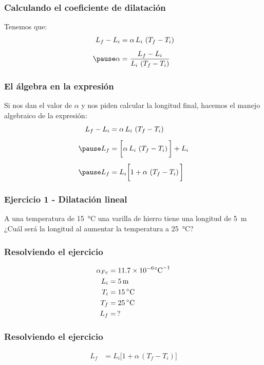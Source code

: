\documentclass[14pt]{beamer}
\begin{document}
\begin{frame}
\frametitle{Calculando el coeficiente de dilatación}
Tenemos que:
\pause
\begin{eqnarray*}
\begin{aligned}
L_{f} - L_{i} &= \alpha \, L_{i} \, \left( T_{f} - T_{i} \right) \\[0.5em] \pause
\alpha &= \dfrac{L_{f} - L_{i}}{L_{i} \, \left( T_{f} - T_{i} \right)}
\end{aligned}
\end{eqnarray*}
\end{frame}
\begin{frame}
\frametitle{El álgebra en la expresión}
Si nos dan el valor de $\alpha$ y nos piden calcular la longitud final, hacemos el manejo algebraico de la expresión:
\pause
\begin{eqnarray*}
\begin{aligned}
L_{f} - L_{i} &= \alpha \, L_{i} \, \left( T_{f} - T_{i} \right) \\[0.5em] \pause
L_{f} &= \bigg[ \alpha \, L_{i} \, \left( T_{f} - T_{i} \right) \bigg] + L_{i} \\[0.5em] \pause
L_{f} &= L_{i} \bigg[ 1 + \alpha \, \left( T_{f} - T_{i} \right) \bigg]
\end{aligned}
\end{eqnarray*}
\end{frame}
\begin{frame}
\frametitle{Ejercicio 1 - Dilatación lineal}
A una temperatura de \SI{15}{\degreeCelsius} una varilla de hierro tiene una longitud de \SI{5}{\meter}
\\
\bigskip
\pause 
¿Cuál será la longitud al aumentar la temperatura a \SI{25}{\degreeCelsius}?
\end{frame}
\begin{frame}
\frametitle{Resolviendo el ejercicio}
\begin{align*}
\alpha_{Fe} &= \num{11.7d-6} \unit{\degreeCelsius}^{-1} \\
L_{i} &= \SI{5}{\meter} \\
T_{i} &= \SI{15}{\degreeCelsius} \\
T_{f} &= \SI{25}{\degreeCelsius} \\
L_{f} &= \,?
\end{align*}
\end{frame}
\begin{frame}
\frametitle{Resolviendo el ejercicio}
\begin{align*}
L_{f} &= L_{i} \bigg[ 1 + \alpha \, \left( T_{f} - T_{i} \right) \bigg]
\end{align*}
\end{frame}
\end{document}
